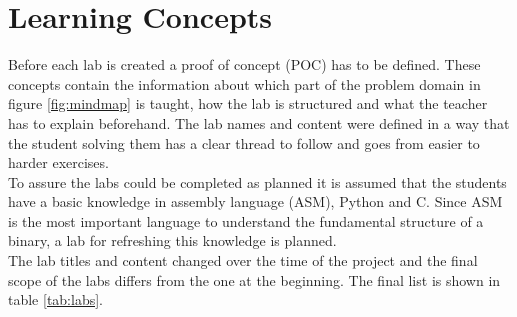 \section{Learning Concepts}
Before each lab is created a proof of concept (POC) has to be defined. These concepts contain the information about which part of the problem domain in figure \ref{fig:mindmap} is taught, how the lab is structured and what the teacher has to explain beforehand. The lab names and content were defined in a way that the student solving them has a clear thread to follow and goes from easier to harder exercises. \\
To assure the labs could be completed as planned it is assumed that the students have a basic knowledge in assembly language (ASM), Python and C. Since ASM is the most important language to understand the fundamental structure of a binary, a lab for refreshing this knowledge is planned.\\
The lab titles and content changed over the time of the project and the final scope of the labs differs from the one at the beginning. The final list is shown in table \ref{tab:labs}. 

